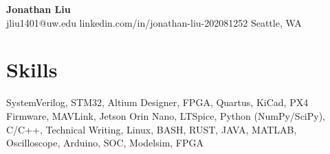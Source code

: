 \documentclass[11pt,letterpaper]{article}
\begin{document}
\begin{center}
{\LARGE \textbf{Jonathan Liu}}\\[2pt]
\small jliu1401@uw.edu \textbullet{} linkedin.com/in/jonathan-liu-202081252 \textbullet{} Seattle, WA
\end{center}
\section*{Skills}
SystemVerilog, STM32, Altium Designer, FPGA, Quartus, KiCad, PX4 Firmware, MAVLink, Jetson Orin Nano, LTSpice, Python (NumPy/SciPy), C/C++, Technical Writing, Linux, BASH, RUST, JAVA, MATLAB, Oscilloscope, Arduino, SOC, Modelsim, FPGA
\end{document}

